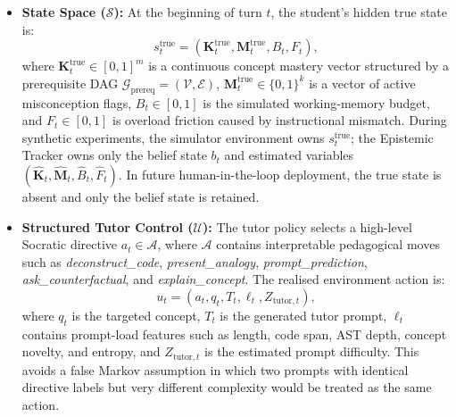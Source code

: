 \documentclass[11pt,a4paper]{report}
\begin{document}
\begin{itemize}
    \item \textbf{State Space ($\mathcal{S}$):} At the beginning of turn $t$, the student's hidden true state is:
    \begin{equation}
        s_t^{\text{true}} =
        \left(\mathbf{K}_t^{\text{true}}, \mathbf{M}_t^{\text{true}}, B_t, F_t\right),
    \end{equation}
    where $\mathbf{K}_t^{\text{true}} \in [0, 1]^m$ is a continuous concept mastery vector structured by a prerequisite DAG $\mathcal{G}_{\text{prereq}} = (\mathcal{V}, \mathcal{E})$, $\mathbf{M}_t^{\text{true}} \in \{0,1\}^k$ is a vector of active misconception flags, $B_t \in [0,1]$ is the simulated working-memory budget, and $F_t \in [0,1]$ is overload friction caused by instructional mismatch. During synthetic experiments, the simulator environment owns $s_t^{\text{true}}$; the Epistemic Tracker owns only the belief state $b_t$ and estimated variables $(\hat{\mathbf{K}}_t,\hat{\mathbf{M}}_t,\hat{B}_t,\hat{F}_t)$. In future human-in-the-loop deployment, the true state is absent and only the belief state is retained.

    \item \textbf{Structured Tutor Control ($\mathcal{U}$):} The tutor policy selects a high-level Socratic directive $a_t \in \mathcal{A}$, where $\mathcal{A}$ contains interpretable pedagogical moves such as \textit{deconstruct\_code}, \textit{present\_analogy}, \textit{prompt\_prediction}, \textit{ask\_counterfactual}, and \textit{explain\_concept}. The realised environment action is:
    \begin{equation}
        u_t = (a_t, q_t, T_t, \ell_t, Z_{\text{tutor},t}),
    \end{equation}
    where $q_t$ is the targeted concept, $T_t$ is the generated tutor prompt, $\ell_t$ contains prompt-load features such as length, code span, AST depth, concept novelty, and entropy, and $Z_{\text{tutor},t}$ is the estimated prompt difficulty. This avoids a false Markov assumption in which two prompts with identical directive labels but very different complexity would be treated as the same action.


\end{itemize}
\end{document}
